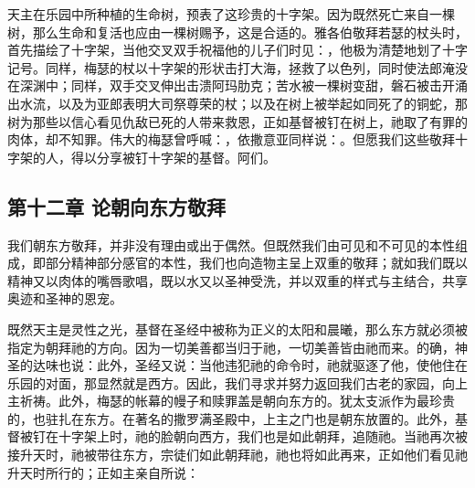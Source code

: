 天主在乐园中所种植的生命树，预表了这珍贵的十字架。因为既然死亡来自一棵树，那么生命和复活也应由一棵树赐予，这是合适的。雅各伯敬拜若瑟的杖头时，首先描绘了十字架，当他交叉双手祝福他的儿子们时见：，他极为清楚地划了十字记号。同样，梅瑟的杖以十字架的形状击打大海，拯救了以色列，同时使法郎淹没在深渊中；同样，双手交叉伸出击溃阿玛肋克；苦水被一棵树变甜，磐石被击开涌出水流，以及为亚郎表明大司祭尊荣的杖；以及在树上被举起如同死了的铜蛇，那树为那些以信心看见仇敌已死的人带来救恩，正如基督被钉在树上，祂取了有罪的肉体，却不知罪。伟大的梅瑟曾呼喊：，依撒意亚同样说：。但愿我们这些敬拜十字架的人，得以分享被钉十字架的基督。阿们。\par


\subsection{第十二章 论朝向东方敬拜}

我们朝东方敬拜，并非没有理由或出于偶然。但既然我们由可见和不可见的本性组成，即部分精神部分感官的本性，我们也向造物主呈上双重的敬拜；就如我们既以精神又以肉体的嘴唇歌唱，既以水又以圣神受洗，并以双重的样式与主结合，共享奥迹和圣神的恩宠。\par

既然天主是灵性之光，基督在圣经中被称为正义的太阳和晨曦，那么东方就必须被指定为朝拜祂的方向。因为一切美善都当归于祂，一切美善皆由祂而来。的确，神圣的达味也说：此外，圣经又说：当他违犯祂的命令时，祂就驱逐了他，使他住在乐园的对面，那显然就是西方。因此，我们寻求并努力返回我们古老的家园，向上主祈祷。此外，梅瑟的帐幕的幔子和赎罪盖是朝向东方的。犹太支派作为最珍贵的，也驻扎在东方。在著名的撒罗满圣殿中，上主之门也是朝东放置的。此外，基督被钉在十字架上时，祂的脸朝向西方，我们也是如此朝拜，追随祂。当祂再次被接升天时，祂被带往东方，宗徒们如此朝拜祂，祂也将如此再来，正如他们看见祂升天时所行的；正如主亲自所说：\par

